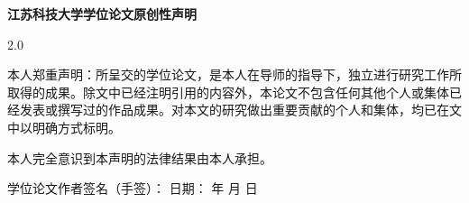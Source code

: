 
{%
  \setlength{\parindent}{2em}%
  \vspace*{2cm}%
  \begin{center}%
    {\songti{}\bfseries 江苏科技大学学位论文原创性声明\par}%
  \end{center}%
  \vspace{21pt}%

  \begin{spacing}{2.0}%
  {\songti{}%
  本人郑重声明：所呈交的学位论文，是本人在导师的指导下，独立进行研究工作所取得的成果。除文中已经注明引用的内容外，本论文不包含任何其他个人或集体已经发表或撰写过的作品成果。对本文的研究做出重要贡献的个人和集体，均已在文中以明确方式标明。

  本人完全意识到本声明的法律结果由本人承担。}
  \end{spacing}%

  \vspace{9em}%
  \begin{center}%
    {\songti{}%
    学位论文作者签名（手签）：\makebox[5em][c]{}\quad
    日期：\makebox[3em][c]{} 年 \makebox[1.5em][c]{} 月 \makebox[1.5em][c]{} 日}
  \end{center}%
}

\newpage

